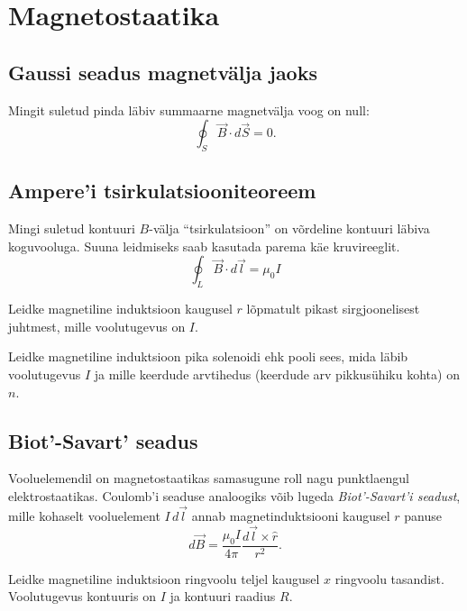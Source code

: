 \documentclass[a4paper,11pt,twocolumn]{article}
\begin{document}
\section{Magnetostaatika}
\subsection{Gaussi seadus magnetvälja jaoks}
Mingit suletud pinda läbiv summaarne magnetvälja voog on null:
\begin{equation*}
    \oint_S\vec{B}\cdot d\vec{S}=0 \tag{II Maxwelli võrrand}.
\end{equation*}

\subsection{Ampere'i tsirkulatsiooniteoreem}

Mingi suletud kontuuri $B$-välja \enquote{tsirkulatsioon} on võrdeline kontuuri läbiva koguvooluga. Suuna leidmiseks saab kasutada parema käe kruvireeglit.
\begin{equation*}
    \oint_L\vec{B}\cdot d\vec{l}=\mu_0 I \tag{III Maxwelli võrrand}
\end{equation*}
\begin{question}
    Leidke magnetiline induktsioon kaugusel $r$ lõpmatult pikast sirgjoonelisest juhtmest, mille voolutugevus on $I$.
\end{question}

\begin{question}
    Leidke magnetiline induktsioon pika solenoidi ehk pooli sees, mida läbib voolutugevus $I$ ja mille keerdude arvtihedus (keerdude arv pikkusühiku kohta) on $n$.
\end{question}

\subsection{Biot'-Savart' seadus}
Vooluelemendil on magnetostaatikas samasugune roll nagu punktlaengul elektrostaatikas. Coulomb’i seaduse analoogiks võib lugeda \textit{Biot’-Savart’i seadust}, mille kohaselt vooluelement \( I\, d\vec{l} \) annab magnetinduktsiooni kaugusel \( r \) panuse
\begin{equation}
    d\vec{B}=\dfrac{\mu_0 I}{4\pi}\dfrac{d\vec{l} \times \hat{r}}{r^2} \tag{Biot'-Savart' seadus}.
\end{equation}

\begin{question}
    Leidke magnetiline induktsioon ringvoolu teljel kaugusel \( x \) ringvoolu tasandist. Voolutugevus kontuuris on \( I \) ja kontuuri raadius \( R \).
\end{question}
\end{document}
